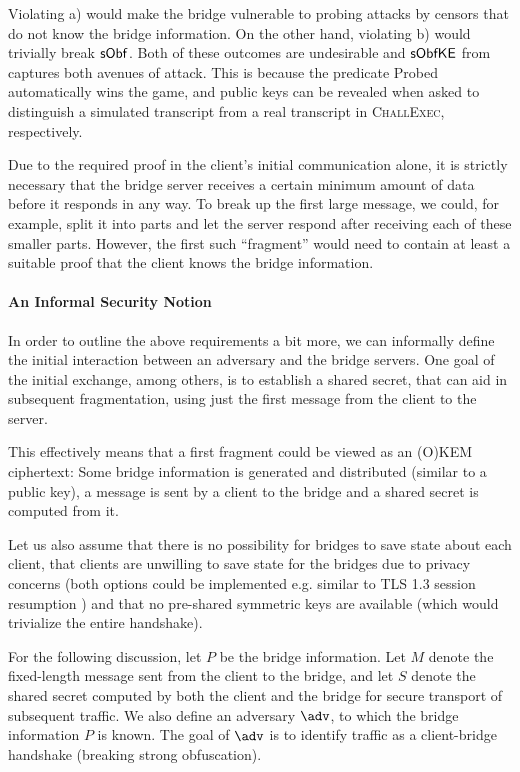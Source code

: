 Violating a) would make the bridge vulnerable to probing attacks by censors that do not know the bridge information. On the other hand, violating b) would trivially break $\mathsf{sObf}$. Both of these outcomes are undesirable and $\mathsf{sObfKE}$ from \cite{CCS:GunSteVei24} captures both avenues of attack. This is because the predicate \textsf{Probed} automatically wins the game, and public keys can be revealed when asked to distinguish a simulated transcript from a real transcript in \textsc{ChallExec}, respectively.

Due to the required proof in the client's initial communication alone, it is strictly necessary that the bridge server receives a certain minimum amount of data before it responds in any way.
To break up the first large \drivel{} message, we could, for example, split it into parts and let the server respond after receiving each of these smaller parts. However, the first such ``fragment'' would need to contain at least a suitable proof that the client knows the bridge information.

\paragraph{An Informal Security Notion}
In order to outline the above requirements a bit more, we can informally define the initial interaction between an adversary and the bridge servers. One goal of the initial exchange, among others, is to establish a shared secret, that can aid in subsequent fragmentation, using just the first message from the client to the server.

This effectively means that a first fragment could be viewed as an (O)KEM ciphertext: Some bridge information is generated and distributed (similar to a public key), a message is sent by a client to the bridge and a shared secret is computed from it.

Let us also assume that there is no possibility for bridges to save state about each client, that clients are unwilling to save state for the bridges due to privacy concerns (both options could be implemented e.g. similar to TLS 1.3 session resumption \cite[Section~2.2]{rfc8446}) and that no pre-shared symmetric keys are available (which would trivialize the entire handshake).

For the following discussion, let $P$ be the bridge information.
Let $M$ denote the fixed-length message sent from the client to the bridge, and let $S$ denote the shared secret computed by both the client and the bridge for secure transport of subsequent traffic.
We also define an adversary $\adv$, to which the bridge information $P$ is known.
The goal of $\adv$ is to identify traffic as a client-bridge handshake (breaking strong obfuscation).


